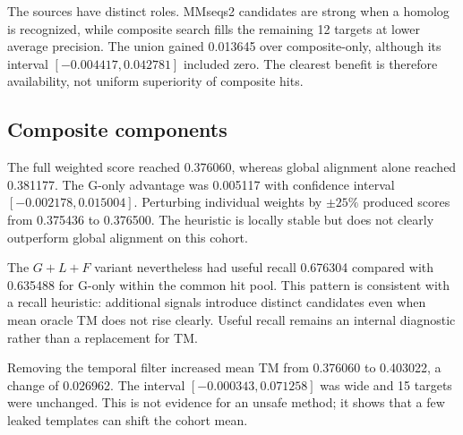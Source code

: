 \documentclass[12pt,a4paper,oneside]{report}
\begin{document}
\begin{table}[H]
\centering
\caption{Retrieval-source results on 20 calibration RNAs. MMseqs2 quality is conditional
on the eight targets with a hit.}
\label{tab:search_source_en}
\end{table}

The sources have distinct roles. MMseqs2 candidates are strong when a homolog is
recognized, while composite search fills the remaining 12 targets at lower average
precision. The union gained 0.013645 over composite-only, although its interval
$[-0.004417,0.042781]$ included zero. The clearest benefit is therefore availability,
not uniform superiority of composite hits.

\subsection{Composite components}

The full weighted score reached 0.376060, whereas global alignment alone reached
0.381177. The G-only advantage was 0.005117 with confidence interval
$[-0.002178,0.015004]$. Perturbing individual weights by $\pm25\%$ produced scores from
0.375436 to 0.376500. The heuristic is locally stable but does not clearly outperform
global alignment on this cohort.

The $G+L+F$ variant nevertheless had useful recall 0.676304 compared with 0.635488 for
G-only within the common hit pool. This pattern is consistent with a recall heuristic:
additional signals introduce distinct candidates even when mean oracle TM does not rise
clearly. Useful recall remains an internal diagnostic rather than a replacement for TM.

Removing the temporal filter increased mean TM from 0.376060 to 0.403022, a change of
0.026962. The interval $[-0.000343,0.071258]$ was wide and 15 targets were unchanged.
This is not evidence for an unsafe method; it shows that a few leaked templates can shift
the cohort mean.
\end{document}
